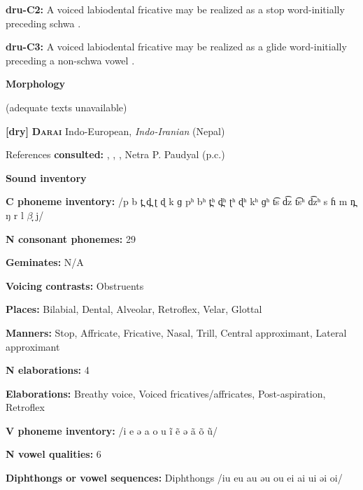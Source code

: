 \textbf{dru-C2:} A voiced labiodental fricative may be realized as a stop word-initially preceding schwa \citep[227]{Chen2006}.



\textbf{dru-C3:} A voiced labiodental fricative may be realized as a glide word-initially preceding a non-schwa vowel \citep[227]{Chen2006}.



\textbf{Morphology}



(adequate texts unavailable)



\textbf{[dry]}   \textbf{\textsc{Darai}}    Indo-European, \textit{Indo-Iranian} (Nepal)



References \textbf{consulted:} \citet{Dhakal2012}, \citet{KotapishKotapish1978}, \citet{Paudyal2003}, Netra P. Paudyal (p.c.)



\textbf{Sound inventory}



\textbf{C phoneme inventory:} /p b t̪ d̪ ʈ ɖ k ɡ pʰ bʰ t̪ʰ d̪ʰ ʈʰ ɖʰ kʰ ɡʰ t͡s d͡z t͡sʰ d͡zʰ s ɦ m n̪ ŋ r l $\beta ̞$ j/



\textbf{N consonant phonemes:} 29



\textbf{Geminates:} N/A



\textbf{Voicing contrasts:} Obstruents



\textbf{Places:} Bilabial, Dental, Alveolar, Retroflex, Velar, Glottal



\textbf{Manners:} Stop, Affricate, Fricative, Nasal, Trill, Central approximant, Lateral approximant



\textbf{N elaborations:} 4



\textbf{Elaborations:} Breathy voice, Voiced fricatives/affricates, Post-aspiration, Retroflex



\textbf{V phoneme inventory:} /i e ə a o u ĩ ẽ ə ã õ ũ/



\textbf{N vowel qualities:} 6



\textbf{Diphthongs or vowel sequences:} Diphthongs /iu eu au əu ou ei ai ui əi oi/



